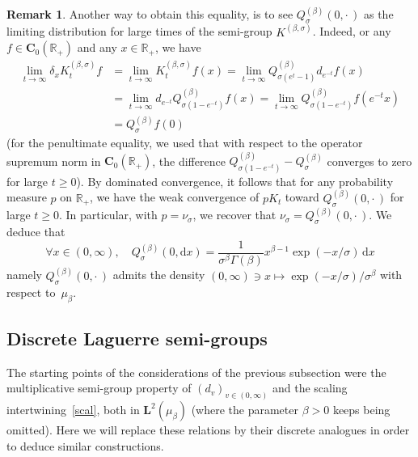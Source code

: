 \documentclass[10pt]{amsart}
\theoremstyle{definition}\newtheorem{defi}[theo]{Definition}\newtheorem{rema}[theo]{Remark}\newtheorem{exam}[theo]{Example}\newtheorem{exem}[theo]{Example}\newtheorem{nota}[theo]{Notation}
\newcommand{\RR}{\mathbb{R}}
\newcommand{\iy}{\infty}
\newcommand{\ri}{\rightarrow}
\newcommand{\esL}{\mathbf{L}}
\newcommand{\esC}{\mathbf{C}}
\let\oldforall\forall
\renewcommand*{\forall}{\mathrel{\oldforall}}
\newcommand*{\dd}{\mathrm{d}}
\newcommand*{\dx}{\dd x}
\begin{document}
\begin{rema}
Another way to obtain this equality, is to see $Q^{(\beta)}_{\sigma}(0,{\cdot\,})$ as the limiting distribution for large times of the semi-group $K^{(\beta,\sigma)}$. Indeed, or any $f\in\esC_0(\RR_+)$ and any $x\in \RR_+$, we have
\begin{align*}
\lim_{t\ri\iy }
\delta_x K_t^{(\beta,\sigma)}f&=
\lim_{t\ri\iy }K_t^{(\beta,\sigma)}f(x)=\lim_{t\ri\iy }Q^{(\beta)}_{\sigma(e^{t}-1)}d_{e^{-t}}f(x)\\
&=\lim_{t\ri\iy }d_{e^{-t}}Q^{(\beta)}_{\sigma(1-e^{-t})}f(x) =\lim_{t\ri\iy }Q^{(\beta)}_{\sigma(1-e^{-t})}f(e^{-t}x)\\
&=Q^{(\beta)}_\sigma f(0)
\end{align*}
(for the penultimate equality, we used that with respect to the operator supremum norm in $\esC_0(\RR_+)$, the difference $Q^{(\beta)}_{\sigma(1-e^{-t})}-Q^{(\beta)}_\sigma$ converges to zero for large $t\geq 0$). By dominated convergence, it follows that for any probability measure $p$ on $\RR_+$, we have the weak convergence of $pK_t$ toward $Q^{(\beta)}_{\sigma}(0,{\cdot\,})$ for large $t\geq 0$. In particular, with $p=\nu_{\sigma}$, we recover that $\nu_{\sigma}=Q^{(\beta)}_{\sigma}(0,{\cdot\,})$. We deduce that
\[
\forall x\in(0,\iy),\quad Q^{(\beta)}_{\sigma}(0,\dx)= \frac{1}{\sigma^{\beta}\Gamma(\beta)}x^{\beta-1}\exp(-x/\sigma)\, \dx
\]
namely $Q^{(\beta)}_{\sigma}(0,{\cdot\,})$ admits the density $(0,\iy)\ni x\mapsto \exp(-x/\sigma)/\sigma^{\beta}$ with respect to~$\mu_{\beta}$.
\end{rema}

\subsection{Discrete Laguerre semi-groups}\label{dLp}

The starting points of the considerations of the previous subsection were the multiplicative semi-group property of $(d_v)_{v\in(0,\iy)}$ and the scaling intertwining~\eqref{scal}, both in $\esL^2(\mu_{\beta})$ (where the parameter $\beta>0$ keeps being omitted). Here we will replace these relations by their discrete analogues in order to deduce similar constructions.
\end{document}
